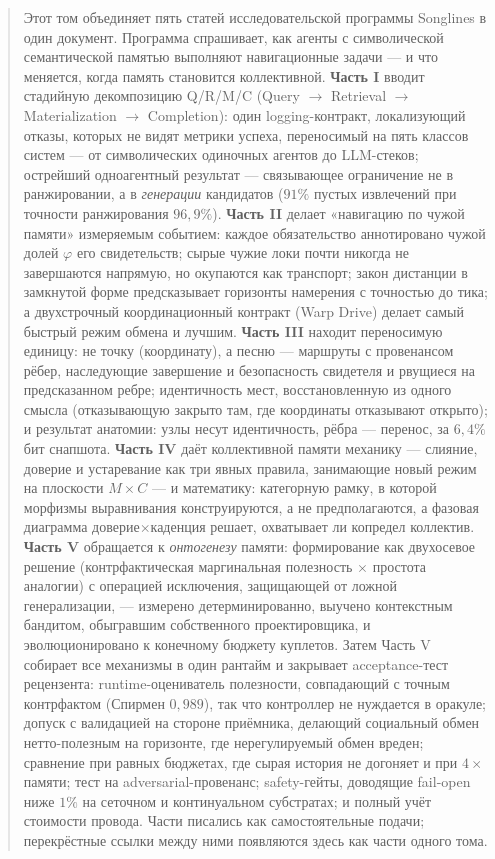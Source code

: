 \begin{abstract}
Этот том объединяет пять статей исследовательской программы
Songlines в один документ. Программа спрашивает, как агенты с
символической семантической памятью выполняют навигационные задачи
--- и что меняется, когда память становится коллективной.
\textbf{Часть I} вводит стадийную декомпозицию Q/R/M/C (Query $\to$
Retrieval $\to$ Materialization $\to$ Completion): один
logging-контракт, локализующий отказы, которых не видят метрики
успеха, переносимый на пять классов систем --- от символических
одиночных агентов до LLM-стеков; острейший одноагентный результат ---
связывающее ограничение не в ранжировании, а в \emph{генерации}
кандидатов ($91\%$ пустых извлечений при точности ранжирования
$96{,}9\%$). \textbf{Часть II} делает «навигацию по чужой памяти»
измеряемым событием: каждое обязательство аннотировано чужой долей
$\varphi$ его свидетельств; сырые чужие локи почти никогда не
завершаются напрямую, но окупаются как транспорт; закон дистанции в
замкнутой форме предсказывает горизонты намерения с точностью до
тика; а двухстрочный координационный контракт (Warp Drive) делает
самый быстрый режим обмена и лучшим. \textbf{Часть III} находит
переносимую единицу: не точку (координату), а песню --- маршруты с
провенансом рёбер, наследующие завершение и безопасность свидетеля и
рвущиеся на предсказанном ребре; идентичность мест, восстановленную
из одного смысла (отказывающую закрыто там, где координаты отказывают
открыто); и результат анатомии: узлы несут идентичность, рёбра ---
перенос, за $6{,}4\%$ бит снапшота. \textbf{Часть IV} даёт
коллективной памяти механику --- слияние, доверие и устаревание как
три явных правила, занимающие новый режим на плоскости $M{\times}C$
--- и математику: категорную рамку, в которой морфизмы выравнивания
конструируются, а не предполагаются, а фазовая диаграмма
доверие$\times$каденция решает, охватывает ли копредел коллектив.
\textbf{Часть V} обращается к \emph{онтогенезу} памяти: формирование
как двухосевое решение (контрфактическая маргинальная полезность
$\times$ простота аналогии) с операцией исключения, защищающей от
ложной генерализации, --- измерено детерминированно, выучено
контекстным бандитом, обыгравшим собственного проектировщика, и
эволюционировано к конечному бюджету куплетов. Затем Часть V собирает
все механизмы в один рантайм и закрывает acceptance-тест рецензента:
runtime-оцениватель полезности, совпадающий с точным контрфактом
(Спирмен $0{,}989$), так что контроллер не нуждается в оракуле;
допуск с валидацией на стороне приёмника, делающий социальный обмен
нетто-полезным на горизонте, где нерегулируемый обмен вреден;
сравнение при равных бюджетах, где сырая история не догоняет и при
$4\times$ памяти; тест на adversarial-провенанс; safety-гейты,
доводящие fail-open ниже $1\%$ на сеточном и континуальном
субстратах; и полный учёт стоимости провода. Части писались как
самостоятельные подачи; перекрёстные ссылки между ними появляются
здесь как части одного тома.
\end{abstract}

